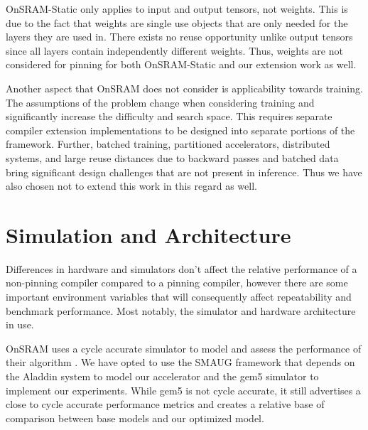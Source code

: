 OnSRAM-Static only applies to input and output tensors, not weights. This is
due to the fact that weights are single use objects that are only needed for
the layers they are used in. There exists no reuse opportunity unlike output
tensors since all layers contain independently different weights. Thus, weights
are not considered for pinning for both OnSRAM-Static and our extension work as
well.

Another aspect that OnSRAM does not consider is applicability towards training.
The assumptions of the problem change when considering training and
significantly increase the difficulty and search space. This requires 
separate compiler extension implementations to be designed into separate
portions of the framework. Further, batched training, partitioned accelerators,
distributed systems, and large reuse distances due to backward passes and
batched data \cite{onsram} bring significant design challenges that are not present in
inference. Thus we have also chosen not to extend this work in this regard as
well.


\section{Simulation and Architecture}

Differences in hardware and simulators don't affect the relative performance of
a non-pinning compiler compared to a pinning compiler, however there are some
important environment variables that will consequently affect repeatability and
benchmark performance. Most notably, the simulator and hardware architecture in
use.

OnSRAM uses a cycle accurate simulator to model and assess the performance of
their algorithm \cite{onsram}.  We have opted to use the SMAUG\cite{smaug}
framework that depends on the Aladdin\cite{aladdin} system to model our
accelerator and the gem5 simulator\cite{gem5} to implement our experiments.
While gem5 is not cycle accurate, it still advertises a close to cycle accurate
performance metrics and creates a relative base of comparison between base
models and our optimized model.


